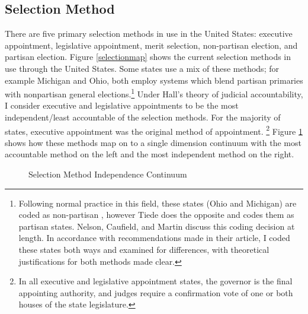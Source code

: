 \documentclass[12pt]{article}
\begin{document}
\subsection*{Selection Method}
There are five primary selection methods in use in the United States: executive appointment, legislative appointment, merit selection, non-partisan election, and partisan election. Figure \ref{selectionmap} shows the current selection methods in use through the United States.  Some states use a mix of these methods; for example Michigan and Ohio, both employ systems which blend partisan primaries with nonpartisan general elections.\footnote{Following normal practice in this field, these states (Ohio and Michigan) are coded as non-partisan \citep{Canes-Wrone2012, Caldarone2009}, however Tiede \citeyearpar{Tiede2006} does the opposite and codes them as partisan states. Nelson, Caufield, and Martin \citeyearpar{Nelson2013} discuss this coding decision at length.  In accordance with recommendations made in their article, I coded these states both ways and examined for differences, with theoretical justifications for both methods made clear.}    Under Hall's \citeyearpar{Hall2007} theory of judicial accountability, I consider executive and legislative appointments to be the most independent/least accountable of the selection methods.  For the majority of states, executive appointment was the original method of appointment.  \footnote{In all executive and legislative appointment states, the governor is the final appointing authority, and judges require a confirmation vote of one or both houses of the state legislature.}  Figure \ref{selectioncontinuum} shows how these methods map on to a single dimension continuum with the most accountable method on the left and the most independent method on the right. 

\begin{figure}[tbh]\centering\caption{Selection Method Independence Continuum}\label{selectioncontinuum}
\end{figure} 
\end{document}
